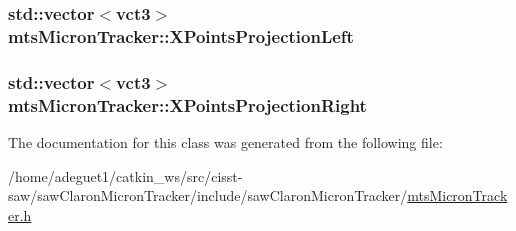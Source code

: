 \hypertarget{classmts_micron_tracker_a2e35c998885291f730e1a55f990b464d}{
\subsubsection[{X\-Points\-Projection\-Left}]{\setlength{\rightskip}{0pt plus 5cm}std\-::vector$<${\bf vct3}$>$ mts\-Micron\-Tracker\-::\-X\-Points\-Projection\-Left\hspace{0.3cm}{\ttfamily [protected]}}}\label{classmts_micron_tracker_a2e35c998885291f730e1a55f990b464d}
\hypertarget{classmts_micron_tracker_a7e0cac34b4700293cd83d15e57ad057f}{
\subsubsection[{X\-Points\-Projection\-Right}]{\setlength{\rightskip}{0pt plus 5cm}std\-::vector$<${\bf vct3}$>$ mts\-Micron\-Tracker\-::\-X\-Points\-Projection\-Right\hspace{0.3cm}{\ttfamily [protected]}}}\label{classmts_micron_tracker_a7e0cac34b4700293cd83d15e57ad057f}


The documentation for this class was generated from the following file\-:\begin{DoxyCompactItemize}
\item 
/home/adeguet1/catkin\-\_\-ws/src/cisst-\/saw/saw\-Claron\-Micron\-Tracker/include/saw\-Claron\-Micron\-Tracker/\hyperlink{mts_micron_tracker_8h}{mts\-Micron\-Tracker.\-h}\end{DoxyCompactItemize}
